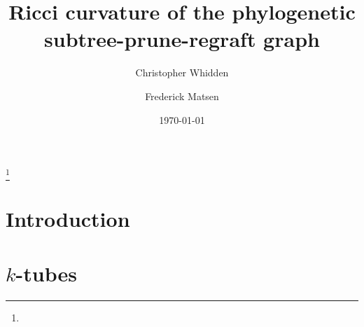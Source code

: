 \documentclass{amsart}
\begin{document}
\title{Ricci curvature of the phylogenetic subtree-prune-regraft graph}
\author[Whidden]{Christopher Whidden}
\author[Matsen]{Frederick Matsen}
\address{}
\thanks{}

\date{\today}

\begin{abstract}
\end{abstract}

\maketitle



\section{Introduction}


\section{$k$-tubes}



% 
% 
\end{document}
